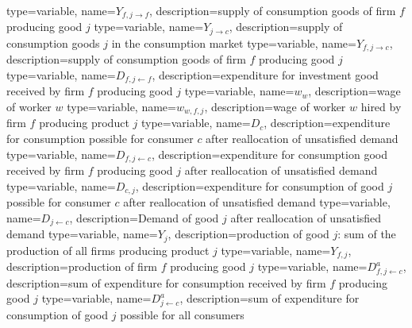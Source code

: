 {%
  type=variable,%
  name={$Y_{f,j\rightarrow f}$},%
  description={supply of consumption goods of firm $f$ producing good $j$} 
}
{%
  type=variable,%
  name={$Y_{j\rightarrow c}$},%
  description={supply of consumption goods $j$ in the consumption market} 
}
{%
  type=variable,%
  name={$Y_{f,j\rightarrow c}$},%
  description={supply of consumption goods of firm $f$ producing good $j$} 
}
{%
  type=variable,%
  name={$D_{f,j\leftarrow f}$},%
  description={expenditure for investment good received by firm $f$ producing good $j$} 
}
{%
  type=variable,%
  name={$w_{w}$},%
  description={wage of worker $w$} 
}
{%
  type=variable,%
  name={$w_{w,f,j}$},%
  description={wage of worker $w$ hired by firm $f$ producing product $j$} 
}
{%
  type=variable,%
  name={$D_{c}$},%
  description={expenditure for consumption possible for consumer $c$ after reallocation of unsatisfied demand} 
}
{%
  type=variable,%
  name={$D_{f,j\leftarrow c}$},%
  description={expenditure for consumption good received by firm $f$ producing good $j$ after reallocation of unsatisfied demand} 
}
{%
  type=variable,%
  name={$D_{c,j}$},%
  description={expenditure for consumption of good $j$ possible for consumer $c$ after reallocation of unsatisfied demand} 
}
{%
  type=variable,%
  name={$D_{j\leftarrow c}$},%
  description={Demand of good $j$ after reallocation of unsatisfied demand} 
}
{%
  type=variable,%
  name={$Y_{j}$},%
  description={production of good $j$: sum of the production of all firms producing product $j$} 
}
{%
  type=variable,%
  name={$Y_{f,j}$},%
  description={production of firm $f$ producing good $j$} 
}
{%
  type=variable,%
  name={$D^a_{f,j\leftarrow c}$},%
  description={sum of expenditure for consumption received by firm $f$ producing good $j$} 
}
{%
  type=variable,%
  name={$D^a_{j\leftarrow c}$},%
  description={sum of expenditure for consumption of good $j$ possible for all consumers} 
}
